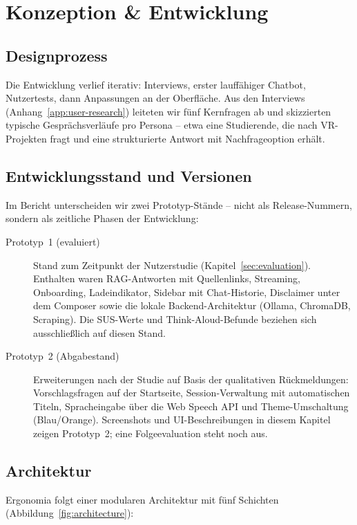 \section{Konzeption \& Entwicklung}

\subsection{Designprozess}

Die Entwicklung verlief iterativ: Interviews, erster lauffähiger Chatbot, Nutzertests, dann Anpassungen an der Oberfläche. Aus den Interviews (Anhang~\ref{app:user-research}) leiteten wir fünf Kernfragen ab und skizzierten typische Gesprächsverläufe pro Persona -- etwa eine Studierende, die nach VR-Projekten fragt und eine strukturierte Antwort mit Nachfrageoption erhält.

\subsection{Entwicklungsstand und Versionen}
\label{sec:versionen}

Im Bericht unterscheiden wir zwei Prototyp-Stände -- nicht als Release-Nummern, sondern als zeitliche Phasen der Entwicklung:

\begin{description}
    \item[Prototyp~1 (evaluiert)] Stand zum Zeitpunkt der Nutzerstudie (Kapitel~\ref{sec:evaluation}). Enthalten waren RAG-Antworten mit Quellenlinks, Streaming, Onboarding, Ladeindikator, Sidebar mit Chat-Historie, Disclaimer unter dem Composer sowie die lokale Backend-Architektur (Ollama, ChromaDB, Scraping). Die SUS-Werte und Think-Aloud-Befunde beziehen sich ausschließlich auf diesen Stand.
    \item[Prototyp~2 (Abgabestand)] Erweiterungen nach der Studie auf Basis der qualitativen Rückmeldungen: Vorschlagsfragen auf der Startseite, Session-Verwaltung mit automatischen Titeln, Spracheingabe über die Web Speech API und Theme-Umschaltung (Blau/Orange). Screenshots und UI-Beschreibungen in diesem Kapitel zeigen Prototyp~2; eine Folgeevaluation steht noch aus.
\end{description}

\subsection{Architektur}

Ergonomia folgt einer modularen Architektur mit fünf Schichten (Abbildung~\ref{fig:architecture}):

